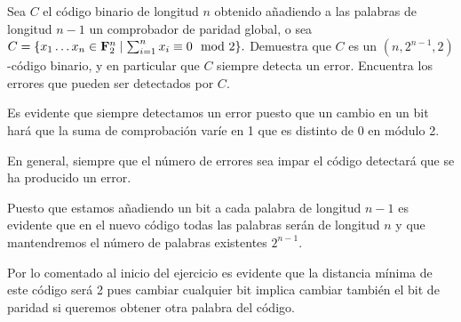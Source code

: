 \begin{problem}[8]  Sea $C$ el código binario de longitud $n$ obtenido
añadiendo a las palabras de longitud $n-1$ un comprobador de
paridad global, o sea $ C=\{x_1\dots x_n\in\bold F_2^n \mid
\sum_{i=1}^n x_i\equiv 0\mod 2\}. $ Demuestra que $C$ es un
$(n,2^{n-1},2)$-código binario, y en particular que $C$ siempre
detecta un error. Encuentra  los errores que
pueden ser detectados por $C$.
\solution


Es evidente que siempre detectamos un error puesto que un cambio en un bit hará que la suma de comprobación varíe en 1 que es distinto de 0 en módulo 2.

En general, siempre que el número de errores sea impar el código detectará que se ha producido un error.

Puesto que estamos añadiendo un bit a cada palabra de longitud $n-1$ es evidente que en el nuevo código todas las palabras serán de longitud $n$ y que mantendremos el número de palabras existentes $2^{n-1}$.

Por lo comentado al inicio del ejercicio es evidente que la distancia mínima de este código será 2 pues cambiar cualquier bit implica cambiar también el bit de paridad si queremos obtener otra palabra del código.
\end{problem}

